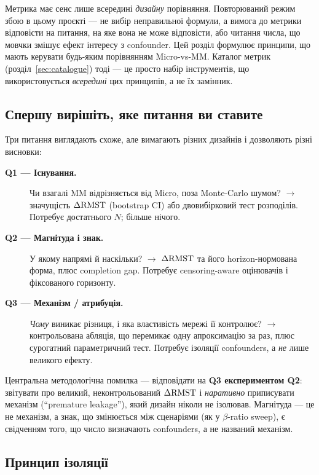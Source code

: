 \documentclass[11pt,a4paper]{article}
\begin{document}
Метрика має сенс лише всередині \emph{дизайну} порівняння.  Повторюваний
режим збою в цьому проєкті --- не вибір неправильної формули, а вимога до
метрики відповісти на питання, на яке вона не може відповісти, або читання числа,
що мовчки змішує ефект інтересу з confounder.  Цей розділ формулює
принципи, що мають керувати будь-яким порівнянням Micro-vs-MM.  Каталог метрик
(розділ~\ref{sec:catalogue}) тоді --- це просто набір інструментів, що
використовується \emph{всередині} цих принципів, а не їх замінник.

\subsection{Спершу вирішіть, яке питання ви ставите}

Три питання виглядають схоже, але вимагають різних дизайнів і дозволяють різні
висновки:

\begin{description}
  \item[\textbf{Q1 --- Існування.}] Чи взагалі MM відрізняється від Micro,
        поза Monte-Carlo шумом?  $\to$ значущість $\Delta\mathrm{RMST}$ (bootstrap CI) або
        двовибірковий тест розподілів.  Потребує достатнього $N$; більше нічого.
  \item[\textbf{Q2 --- Магнітуда і знак.}] У якому напрямі й наскільки?
        $\to$ $\Delta\mathrm{RMST}$ та його horizon-нормована форма, плюс
        completion gap.  Потребує censoring-aware оцінювачів і фіксованого горизонту.
  \item[\textbf{Q3 --- Механізм / атрибуція.}] \emph{Чому} виникає різниця,
        і яка властивість мережі її контролює?  $\to$ контрольована
        абляція, що перемикає одну апроксимацію за раз, плюс сурогатний
        параметричний тест.  Потребує ізоляції confounders, а \emph{не} лише
        великого ефекту.
\end{description}

Центральна методологічна помилка --- відповідати на \textbf{Q3 експериментом Q2}:
звітувати про великий, неконтрольований $\Delta\mathrm{RMST}$ і \emph{наративно} приписувати
механізм (``premature leakage''), який дизайн ніколи не ізолював.  Магнітуда --- це
не механізм, а знак, що змінюється між сценаріями (як у $\beta$-ratio
sweep), є свідченням того, що число визначають confounders, а не названий механізм.

\subsection{Принцип ізоляції}
\end{document}
